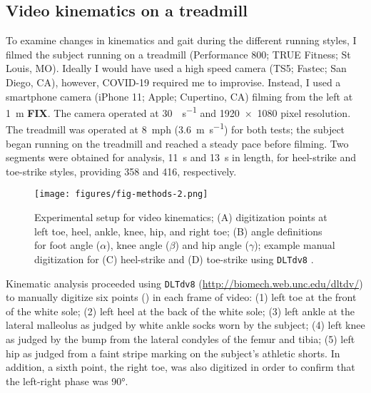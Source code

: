 \subsection{Video kinematics on a treadmill}
To examine changes in kinematics and gait during the different running styles, I filmed the subject running on a treadmill (Performance 800; TRUE Fitness; St Louis, MO). Ideally I would have used a high speed camera (TS5; Fastec; San Diego, CA), however, COVID-19 required me to improvise. Instead, I used a smartphone camera (iPhone 11; Apple; Cupertino, CA) filming from the left at \SI{1}{\meter} \textbf{FIX}. The camera operated at \SI{30}{\frame\per\second} and \num{1920x1080} pixel resolution. The treadmill was operated at \SI{8}{mph} (\SI{3.6}{\meter\per\second}) for both tests; the subject began running on the treadmill and reached a steady pace before filming.  Two segments were obtained for analysis, \SI{11}{\second} and \SI{13}{\second} in length, for heel-strike and toe-strike styles, providing \SI{358}{\frame} and \SI{416}{\frame}, respectively.
\begin{figure}
\begin{center}
\texttt{[image: figures/fig-methods-2.png]}
\end{center}
\caption{Experimental setup for video kinematics; (A) digitization points at left toe, heel, ankle, knee, hip, and right toe; (B) angle definitions for foot angle ($\alpha$), knee angle ($\beta$) and hip angle ($\gamma$); example manual digitization for (C) heel-strike and (D) toe-strike using \lstinline{DLTdv8} \citep{hedrick2008software}.}
\label{fig:methods:kinematics}
\end{figure}

Kinematic analysis proceeded using \citet{hedrick2008software} \lstinline{DLTdv8} (\url{http://biomech.web.unc.edu/dltdv/}) to manually digitize six points () in each frame of video: (1) left toe at the front of the white sole; (2) left heel at the back of the white sole; (3) left ankle at the lateral malleolus as judged by white ankle socks worn by the subject; (4) left knee as judged by the bump from the lateral condyles of the femur and tibia; (5) left hip as judged from a faint stripe marking on the subject's athletic shorts. In addition, a sixth point, the right toe, was also digitized in order to confirm that the left-right phase was \ang{90}. 

